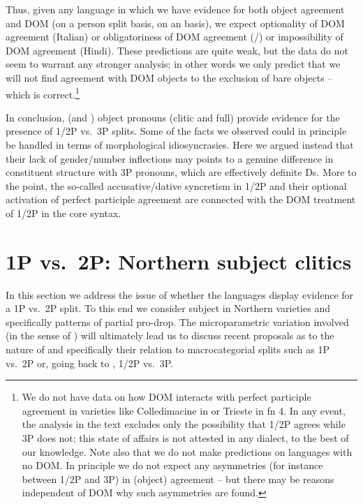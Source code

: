 \documentclass[output=paper]{langsci/langscibook}
\begin{document}
Thus, given any language in which we have evidence for both object agreement
and \gls{DOM} (on a person split basis, on an  basis), we expect
optionality of \gls{DOM} agreement (Italian) or obligatoriness of \gls{DOM}
agreement (/) or impossibility of \gls{DOM} agreement (Hindi).
These predictions are quite weak, but the data do not seem to warrant any
stronger analysis; in other words we only predict that we will not find
agreement with DOM objects to the exclusion of bare objects – which is
correct.\footnote{We do not have data on how \gls{DOM} interacts with perfect
    participle agreement in varieties like Colledimacine in 
    or Trieste in fn 4.  In any event, the analysis in the text excludes only
    the possibility that 1/2P agrees while 3P does not; this state of affairs
    is not attested in any  dialect, to the best of our knowledge. Note
    also that we do not make predictions on languages with no DOM. In principle
    we do not expect any asymmetries (for instance between 1/2P and 3P) in
(object) agreement – but there may be reasons independent of \gls{DOM} why such
asymmetries are found.\label{fn:06.6}}

In conclusion,  (and ) object pronouns (clitic and full) provide
evidence for the presence of 1/2P vs.\ 3P splits. Some of the facts we observed
could in principle be handled in terms of morphological idiosyncrasies. Here we
argued instead that their lack of gender/number inflections may points to a
genuine difference in constituent structure with 3P pronouns, which are
effectively definite Ds. More to the point, the so-called accusative/dative
syncretism in  1/2P  and their optional activation of perfect
participle agreement are connected with the \gls{DOM} treatment of 1/2P  in
the core syntax.

\section{1P vs.\ 2P\@: Northern  subject clitics}\label{sec:06.2}

In this section we address the issue of whether the  languages display
evidence for a 1P vs.\ 2P split. To this end we consider subject  in
Northern  varieties and specifically patterns of partial pro-drop. The
microparametric variation involved (in the sense of \citealt{Kayne2000}) will
ultimately lead us to discuss recent proposals as to the nature of
and specifically their relation to macrocategorial splits such as 1P vs.\ 2P or,
going back to , 1/2P vs.\ 3P.
\end{document}
